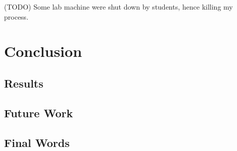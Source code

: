 \documentclass[bsc,logo,twoside,fullspacing,parskip]{infthesis}
\begin{document}
(TODO) Some lab machine were shut down by students, hence killing my process.

\newpage

\chapter{Conclusion}
\section{Results}
\section{Future Work}
\section{Final Words}











\end{document}
